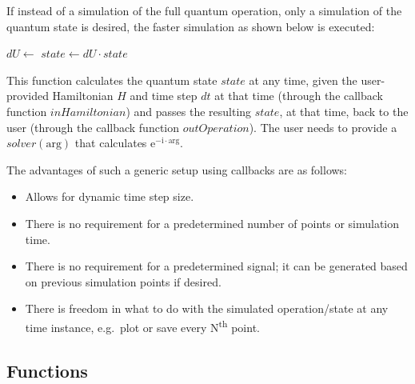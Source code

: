 \documentclass[10pt,a4paper,onecolumn,notitlepage]{article}
\begin{document}
If instead of a simulation of the full quantum operation, only a simulation of the quantum state is desired, the faster simulation as shown below is executed:
\begin{algorithmic}
	\State $dU \gets$ 
	\State $state \gets dU \cdot state$
	\State {}
	\EndWhile
	\EndFunction
\end{algorithmic}
This function calculates the quantum state $state$ at any time, given the user-provided Hamiltonian $H$ and time step $dt$ at that time (through the callback function $\mathit{inHamiltonian}$) and passes the resulting $state$, at that time, back to the user (through the callback function $\mathit{outOperation}$). The user needs to provide a $\mathit{solver}(\mathrm{arg})$ that calculates $\mathrm{e}^{-\mathrm{i} \cdot \mathrm{arg}}$.

The advantages of such a generic setup using callbacks are as follows:
\begin{itemize}
	\item Allows for dynamic time step size.
	\item There is no requirement for a predetermined number of points or simulation time.
	\item There is no requirement for a predetermined signal; it can be generated based on previous simulation points if desired.
	\item There is freedom in what to do with the simulated operation/state at any time instance, e.g.~plot or save every N\textsuperscript{th} point.
\end{itemize}

\subsection{Functions}
\end{document}
